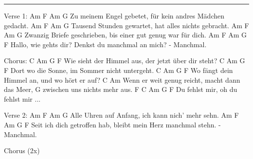 \noindent\rule{\columnwidth}{1pt}

\begin{lstsong}
Verse 1:
Am                F      Am                        G
Zu meinem Engel gebetet, für kein andres Mädchen gedacht.
Am                F      Am                        G
Tausend Stunden gewartet, hat alles nichts gebracht.
Am                F      Am                        G
Zwanzig Briefe geschrieben, bis einer gut genug war für dich.
Am                F      Am                   G     F
Hallo, wie gehts dir? Denkst du manchmal an mich? - Manchmal.

Chorus:
               C        Am                   G      F
Wie sieht der Himmel aus, der jetzt über dir steht?
             C        Am                 G      F
Dort wo die Sonne, im Sommer nicht untergeht.
               C       Am                G      F
Wo fängt dein Himmel an, und wo hört er auf?
              C                            Am
Wenn er weit genug reicht, macht dann das Meer,
                         G
zwischen uns nichts mehr aus.
     F                 C            Am  G   F
Du fehlst mir, oh du fehlst mir ...
 
Verse 2:
Am                F   Am                   G
Alle Uhren auf Anfang, ich kann nich' mehr sehn.
Am                F           Am                         G      F
Seit ich dich getroffen hab, bleibt mein Herz manchmal stehn. - Manchmal.

Chorus (2x)
\end{lstsong}
\newpage



